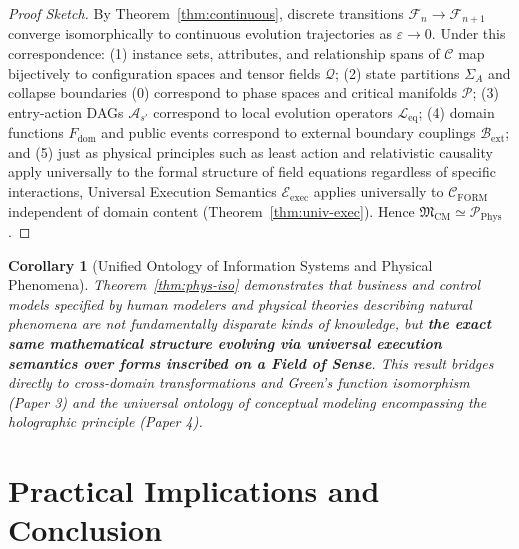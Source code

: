 \documentclass[11pt,a4paper]{article}
\theoremstyle{definition}
\theoremstyle{plain}
\newtheorem{corollary}{Corollary}[section]
\theoremstyle{remark}
\newcommand{\Cform}{\mathcal{C}_{\mathrm{FORM}}}
\begin{document}
\begin{proof}[Proof Sketch]
By Theorem~\ref{thm:continuous}, discrete transitions $\mathcal{F}_n \to \mathcal{F}_{n+1}$ converge isomorphically to continuous evolution trajectories as $\varepsilon \to 0$. Under this correspondence: (1) instance sets, attributes, and relationship spans of $\mathcal{C}$ map bijectively to configuration spaces and tensor fields $\mathcal{Q}$; (2) state partitions $\Sigma_A$ and collapse boundaries ($0$) correspond to phase spaces and critical manifolds $\mathcal{P}$; (3) entry-action DAGs $\mathcal{A}_{s'}$ correspond to local evolution operators $\mathcal{L}_{\mathrm{eq}}$; (4) domain functions $F_{\mathrm{dom}}$ and public events correspond to external boundary couplings $\mathcal{B}_{\mathrm{ext}}$; and (5) just as physical principles such as least action and relativistic causality apply universally to the formal structure of field equations regardless of specific interactions, Universal Execution Semantics $\mathcal{E}_{\mathrm{exec}}$ applies universally to $\Cform$ independent of domain content (Theorem~\ref{thm:univ-exec}). Hence $\mathfrak{M}_{\mathrm{CM}} \simeq \mathcal{P}_{\mathrm{Phys}}$.
\end{proof}

\begin{corollary}[Unified Ontology of Information Systems and Physical Phenomena]\label{cor:unified}
Theorem~\ref{thm:phys-iso} demonstrates that business and control models specified by human modelers and physical theories describing natural phenomena are not fundamentally disparate kinds of knowledge, but \textbf{the exact same mathematical structure evolving via universal execution semantics over forms inscribed on a Field of Sense}. This result bridges directly to cross-domain transformations and Green's function isomorphism (Paper 3) and the universal ontology of conceptual modeling encompassing the holographic principle (Paper 4).
\end{corollary}

\section{Practical Implications and Conclusion}
\end{document}
